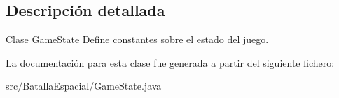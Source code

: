 \subsection{Descripción detallada}
Clase \hyperlink{classBatallaEspacial_1_1GameState}{GameState} Define constantes sobre el estado del juego. 

La documentación para esta clase fue generada a partir del siguiente fichero:\begin{DoxyCompactItemize}
\item 
src/BatallaEspacial/GameState.java\end{DoxyCompactItemize}
